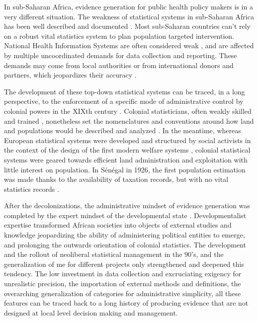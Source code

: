 In sub-Saharan Africa, evidence generation for public health policy makers is in a very different situation. The weakness of statistical systems in sub-Saharan Africa has been well described and documented \citep{jerven_poor_2013}. Most sub-Saharan countries can't rely on a robust vital statistics system to plan population targeted intervention. National Health Information Systems are often considered weak \citep{abou-zahr_better_2010,kiberu_strengthening_2014}, and are affected by multiple uncoordinated demands for data collection and reporting. These demands may come from local authorities or from international donors and partners, which jeopardizes their accuracy \citep{sandefur_political_2013}.

The development of these top-down statistical systems can be traced, in a long perspective, to the enforcement of  a specific mode of administrative control by colonial powers in the XIXth century \citep{appadurai_number_1996,cordell_couting_2010,gervais_how_2010}. Colonial statisticians, often weakly skilled and trained \citep{kateb_gestion_1998,cordell_couting_2010}, nonetheless set the nomenclatures and conventions around how land and populations would be described and analyzed \citep{rambert_cartographie_1922,gervais_how_2010}. In the meantime, whereas European statistical systems were developed and structured by social activists in the context of the design of the first modern welfare systems \citep{desrosieres_politique_1993,desrosieres_administrator_1997}, colonial statistical systems were geared towards efficient land administration and exploitation \citep{rambert_cartographie_1922,de_martonne_cartographie_1931} with little interest on population. In Sénégal in 1926, the first population estimation was made thanks to the availability of taxation records, but with no vital statistics records \citep{rousseau_population_1929}.

After the decolonizations, the administrative mindset of evidence generation was completed by the expert mindset of the developmental state \citep{bonneuil_development_2000}. Developmentalist expertise transformed African societies into objects of external studies and knowledge jeopardizing the ability of administering political entities to emerge, and prolonging the outwards orientation of colonial statistics. The development and the rollout of neoliberal statistical management in the 90's, and the generalization of \gls{me} for different projects \citep{desrosieres_prouver_2014} only strengthened and deepened this tendency. The low investment in data collection and excruciating exigency for unrealistic precision, the importation of external methods and definitions, the overarching generalization of categories for administrative simplicity, all these features can be traced back to a long history of producing evidence that are not designed at local level decision making and management.



